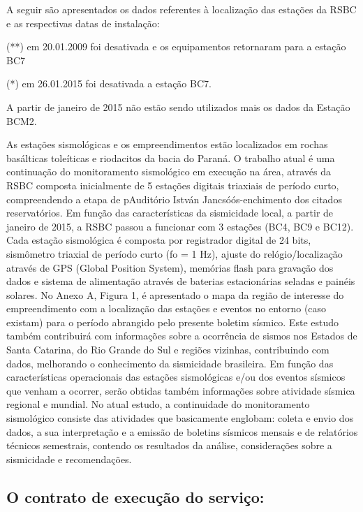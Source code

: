 A seguir são apresentados os dados referentes à localização das estações da RSBC e as respectivas datas de instalação:
\begin{table}
\end{table}
\caption*{(**) em 20.01.2009 foi desativada e os equipamentos retornaram para a estação BC7}
\caption*{(*) em 26.01.2015 foi desativada a estação BC7.}
\caption*{A partir de janeiro de 2015 não estão sendo utilizados mais os dados da Estação BCM2.}

As estações sismológicas e os empreendimentos estão localizados em rochas basálticas toleíticas e riodacitos da bacia do Paraná.
O trabalho atual é uma continuação do monitoramento sismológico em execução na área, através da RSBC composta inicialmente de 5 estações digitais triaxiais de período curto, compreendendo a etapa de pAuditório István Jancsóós-enchimento dos citados reservatórios. Em função das características da sismicidade local, a partir de janeiro de 2015, a RSBC passou a funcionar com 3 estações (BC4, BC9 e BC12).
Cada estação sismológica é composta por registrador digital de 24 bits, sismômetro triaxial de período curto (fo = 1 Hz), ajuste do relógio/localização através de GPS (Global Position System), memórias flash para gravação dos dados e sistema de alimentação através de baterias estacionárias seladas e painéis solares.
No Anexo A, Figura 1, é apresentado o mapa da região de interesse do empreendimento com a localização das estações e eventos no entorno (caso existam) para o período abrangido pelo presente boletim sísmico.
Este estudo também contribuirá com informações sobre a ocorrência de sismos nos Estados de Santa Catarina, do Rio Grande do Sul e regiões vizinhas, contribuindo com dados, melhorando o conhecimento da sismicidade brasileira.
Em função das características operacionais das estações sismológicas e/ou dos eventos sísmicos que venham a ocorrer, serão obtidas também informações sobre atividade sísmica regional e mundial.
No atual estudo, a continuidade do monitoramento sismológico consiste das atividades que basicamente englobam: coleta e envio dos dados, a sua interpretação e a emissão de boletins sísmicos mensais e de relatórios técnicos semestrais, contendo os resultados da análise, considerações sobre a sismicidade e recomendações.

\subsection{O contrato de execução do serviço:}

